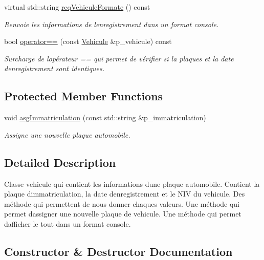 \begin{DoxyCompactItemize}
virtual std\+::string \hyperlink{classsaaq_1_1Vehicule_a9d0ff95273ecd7858cf9bd12aac359ba}{req\+Vehicule\+Formate} () const
\begin{DoxyCompactList}\small\item\em Renvoie les informations de l\textquotesingle{}enregistrement dans un format console. \end{DoxyCompactList}\item 
bool \hyperlink{classsaaq_1_1Vehicule_a9dd4c5e7c74ebabd5f4ce651d21d79fc}{operator==} (const \hyperlink{classsaaq_1_1Vehicule}{Vehicule} \&p\+\_\+vehicule) const
\begin{DoxyCompactList}\small\item\em Surcharge de l\textquotesingle{}opérateur == qui permet de vérifier si la plaques et la date d\textquotesingle{}enregistrement sont identiques. \end{DoxyCompactList}\end{DoxyCompactItemize}
\subsection*{Protected Member Functions}
\begin{DoxyCompactItemize}
\item 
void \hyperlink{classsaaq_1_1Vehicule_a17c2ad3a6fabdf37c47811a9b0183e24}{asg\+Immatriculation} (const std\+::string \&p\+\_\+immatriculation)
\begin{DoxyCompactList}\small\item\em Assigne une nouvelle plaque automobile. \end{DoxyCompactList}\end{DoxyCompactItemize}


\subsection{Detailed Description}
Classe vehicule qui contient les informations d\textquotesingle{}une plaque automobile. Contient la plaque d\textquotesingle{}immatriculation, la date d\textquotesingle{}enregistrement et le N\+IV du vehicule. Des méthode qui permettent de nous donner chaques valeurs. Une méthode qui permet d\textquotesingle{}assigner une nouvelle plaque de vehicule. Une méthode qui permet d\textquotesingle{}afficher le tout dans un format console. 

\subsection{Constructor \& Destructor Documentation}
\mbox{\label{classsaaq_1_1Vehicule_a20f052188538616a6f54ee1061398319}} 
